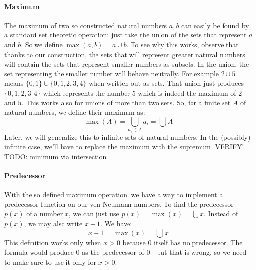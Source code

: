 \paragraph{Maximum}
The maximum of two so constructed natural numbers $a,b$ can easily be found by a standard set theoretic operation: just take the union of the sets that represent $a$ and $b$. So we define $\max(a,b) = a \cup b$. To see why this works, observe that thanks to our construction, the sets that will represent greater natural numbers will contain the sets that represent smaller numbers as subsets. In the union, the set representing the smaller number will behave neutrally. For example $2 \cup 5$ means $\{0,1\} \cup \{0,1,2,3,4\}$ when written out as sets. That union just produces $\{0,1,2,3,4\}$ which represents the number $5$ which is indeed the maximum of $2$ and $5$. This works also for unions of more than two sets. So, for a finite set $A$ of natural numbers, we define their maximum as:
\begin{equation}
\max(A) = \bigcup_{a_i \in A} a_i = \bigcup A
\end{equation}
Later, we will generalize this to infinite sets of natural numbers. In the (possibly) infinite case, we'll have to replace the maximum with the supremum [VERIFY!]. TODO: minimum via intersection

\paragraph{Predecessor}
With the so defined maximum operation, we have a way to implement a predecessor function on our von Neumann numbers. To find the predecessor $p(x)$ of a number $x$, we can just use $p(x) = \max(x) = \bigcup x$. Instead of $p(x)$, we may also write $x-1$. We have:
\begin{equation}
x - 1 = \max(x) = \bigcup x
\end{equation}
This definition works only when $x > 0$ because $0$ itself has no predecessor. The formula would produce $0$ as the predecessor of $0$ - but that is wrong, so we need to make sure to use it only for $x > 0$.

